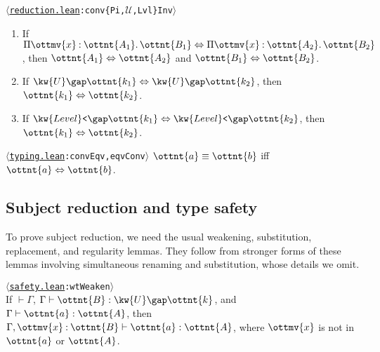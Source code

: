 \documentclass[a4paper,UKenglish,cleveref,autoref,thm-restate]{lipics-v2021}
\newcommand{\repo}{https://github.com/ionathanch/TTBFL}
\newcommand{\thmref}[2]{%
  $\langle$\href{\repo/tree/main/src/#1}{\texttt{#1}}\texttt{:#2}$\rangle$%
}
\begin{document}
\begin{lemma} \thmref{reduction.lean}{conv\{Pi,$\mathcal{U}$,Lvl\}Inv}
  \begin{enumerate}[topsep=0pt]
    \item If $  \Pi  \ottmv{x}  \mathbin{:}  \ottnt{A_{{\mathrm{1}}}}  \mathpunct{.}  \ottnt{B_{{\mathrm{1}}}}   \Leftrightarrow   \Pi  \ottmv{x}  \mathbin{:}  \ottnt{A_{{\mathrm{2}}}}  \mathpunct{.}  \ottnt{B_{{\mathrm{2}}}}  $, then $ \ottnt{A_{{\mathrm{1}}}}  \Leftrightarrow  \ottnt{A_{{\mathrm{2}}}} $ and $ \ottnt{B_{{\mathrm{1}}}}  \Leftrightarrow  \ottnt{B_{{\mathrm{2}}}} $.
    \item If $  \kw{U} \gap  \ottnt{k_{{\mathrm{1}}}}   \Leftrightarrow   \kw{U} \gap  \ottnt{k_{{\mathrm{2}}}}  $, then $ \ottnt{k_{{\mathrm{1}}}}  \Leftrightarrow  \ottnt{k_{{\mathrm{2}}}} $.
    \item If $  \kw{Level}\texttt{<} \gap  \ottnt{k_{{\mathrm{1}}}}   \Leftrightarrow   \kw{Level}\texttt{<} \gap  \ottnt{k_{{\mathrm{2}}}}  $, then $ \ottnt{k_{{\mathrm{1}}}}  \Leftrightarrow  \ottnt{k_{{\mathrm{2}}}} $.
  \end{enumerate}
\end{lemma}

\begin{theorem} \thmref{typing.lean}{convEqv,eqvConv} \label{lem:eq-conv}
  $ \ottnt{a}  \equiv  \ottnt{b} $ iff $ \ottnt{a}  \Leftrightarrow  \ottnt{b} $.
\end{theorem}

\subsection{Subject reduction and type safety}

To prove subject reduction,
we need the usual weakening, substitution, replacement, and regularity lemmas.
They follow from stronger forms of these lemmas involving simultaneous renaming and substitution,
whose details we omit.


\begin{lemma}[Weakening (w.t.)] \thmref{safety.lean}{wtWeaken} \label{lem:wt:weak} \\
  If $ \mathop{\vdash}  \Gamma $, $ \Gamma  \vdash  \ottnt{B}  \mathrel{:}   \kw{U} \gap  \ottnt{k}  $, and $ \Gamma  \vdash  \ottnt{a}  \mathrel{:}  \ottnt{A} $,
  then $  \Gamma ,  \ottmv{x}  \mathbin{:}  \ottnt{B}   \vdash  \ottnt{a}  \mathrel{:}  \ottnt{A} $, where $\ottmv{x}$ is not in $\ottnt{a}$ or $\ottnt{A}$.
\end{lemma}
\end{document}
